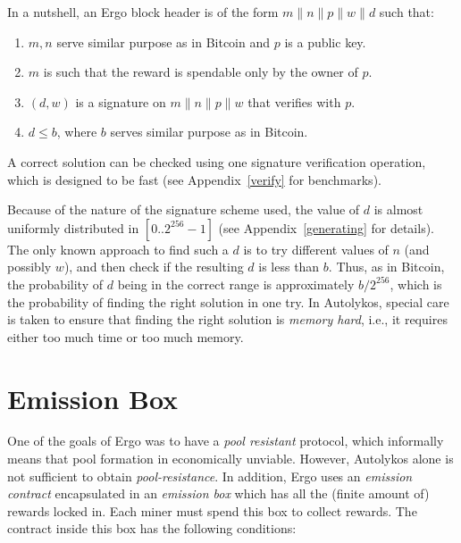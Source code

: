 \documentclass[11pt]{article}
\newcommand{\powname}{Autolykos\xspace}
\begin{document}
In a nutshell, an Ergo block header is of the form $m\|n\|p\|w\|d$ such that:
\begin{enumerate}
	\item $m, n$ serve similar purpose as in Bitcoin and $p$ is a public key.
	\item $m$ is such that the reward is spendable only by the owner of $p$.
	\item $(d, w)$ is a signature on $m\|n\|p\|w$ that verifies with $p$.
	\item $d\leq b$, where $b$ serves similar purpose as in Bitcoin. 
\end{enumerate}

A correct solution can be checked using one signature verification operation, which is designed to be fast (see Appendix~\ref{verify} for benchmarks).

Because of the nature of the signature scheme used, the value of $d$ is almost uniformly distributed in $[0..2^{256}-1]$ (see Appendix~\ref{generating} for details). The only known approach to find such a $d$ is to try different values of $n$ (and possibly $w$), and then check if the resulting $d$ is less than $b$.
Thus, as in Bitcoin, the probability of $d$ being in the correct range is approximately $b/2^{256}$, which is the probability of finding the right solution in one try.
In \powname, special care is taken to ensure that finding the right solution is {\em memory hard}, i.e., it requires either too much time or too much memory. 
\section{Emission Box}

\label{emission}

One of the goals of Ergo was to have a {\em pool resistant} protocol, which informally means that pool formation in economically unviable.
However, \powname alone is not sufficient to obtain {\em pool-resistance}. In addition, Ergo uses an {\em emission contract} encapsulated in an {\em emission box} which has all the (finite amount of) rewards locked in. Each miner must spend this box to collect rewards. The contract inside this box has the following conditions:
\end{document}
